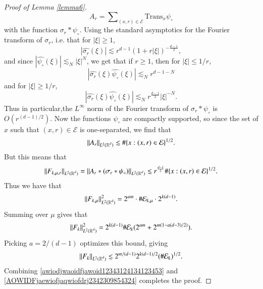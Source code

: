 \begin{proof}[Proof of Lemma \ref{lemma6}]
    \begin{equation}
      A_r = \sum\nolimits_{(x,r) \in \mathcal{E}} \text{Trans}_x \psi_{\circ}
    \end{equation}
    with the function $\sigma_r * \psi_{\circ}$. Using the standard asymptotics for the Fourier transform of $\sigma_r$, i.e. that for $|\xi| \geq 1$,
    \begin{equation}
      |\widehat{\sigma_r}(\xi)| \lesssim r^{d-1} (1 + r |\xi|)^{- \frac{d-1}{2}},
    \end{equation}
    and since $|\widehat{\psi_\circ}(\xi)| \lesssim_N |\xi|^N$, we get that if $r \geq 1$, then for $|\xi| \leq 1/r$,
    \begin{equation}
      |\widehat{\sigma_r}(\xi) \widehat{\psi_\circ}(\xi)| \lesssim_N r^{d-1-N}
    \end{equation}
    and for $|\xi| \geq 1/r$,
    \begin{equation}
      |\widehat{\sigma_r}(\xi) \widehat{\psi_\circ}(\xi)| \lesssim_N r^{\frac{d-1}{2}} |\xi|^{-N}.
    \end{equation}
    Thus in particular,the $L^\infty$ norm of the Fourier transform of $\sigma_r * \psi_\circ$ is $O(r^{(d-1)/2})$. Now the functions $\psi_{\circ}$ are compactly supported, so since the set of $x$ such that $(x,r) \in \mathcal{E}$ is one-separated, we find that
    \begin{equation}
      \| A_r \|_{L^2(\operatorname{\mathbb{R}}^d)} \lesssim \# \{ x : (x,r) \in \mathcal{E} \}^{1/2}.
    \end{equation}
    But this means that
    \begin{equation}
      \| F_{k,\mu,r} \|_{L^2(\operatorname{\mathbb{R}}^d)} = \| A_r * (\sigma_r * \psi_{\circ}) \|_{L^2(\operatorname{\mathbb{R}}^d)} \lesssim r^{\frac{d-1}{2}} \# \{ x : (x,r) \in \mathcal{E} \}^{1/2}.
    \end{equation}
    Thus we have that
    \begin{equation}
      \| F_{k,\mu} \|_{L^2(\operatorname{\mathbb{R}}^d)}^2 = 2^{am} \cdot \# \mathcal{E}_{k,\mu} \cdot 2^{k(d-1)}.
    \end{equation}
    Summing over $\mu$ gives that
    \begin{equation}
      \| F_k \|_{L^2(\operatorname{\mathbb{R}}^d)}^2 = 2^{k(d-1)} \# \mathcal{E}_k (2^{am}  + 2^{m(1 - a(d-3)/2)}).
    \end{equation}
    Picking $a = 2/(d-1)$ optimizes this bound, giving
    \begin{equation} \label{AOWIDFjaewiofjaqwiofdrj2342309854324}
      \| F_k \|_{L^2(\operatorname{\mathbb{R}}^d)} \lesssim 2^{m/(d-1)} 2^{k(d-1)/2} (\# \mathcal{E}_k)^{1/2}.
    \end{equation}
    Combining \eqref{awiodjwaoidfjawoid12343124134123453} and \eqref{AOWIDFjaewiofjaqwiofdrj2342309854324} completes the proof.
\end{proof}

